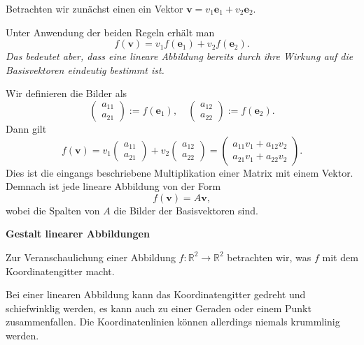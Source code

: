 \documentclass[9pt]{beamer}
\newcommand{\bv}[1]{\mathbf{#1}}
\newcommand{\R}{\mathbb R}
\newcommand{\strong}[1]{\textsf{\textbf{#1}}}
\newcommand{\parspace}{\vspace{0.8em}}
\begin{document}
\begin{frame}
Betrachten wir zunächst einen ein Vektor $\bv v = v_1\bv e_1+v_2\bv e_2$.

\parspace
Unter Anwendung der beiden Regeln erhält man\pause
\[f(\bv v) = v_1f(\bv e_1)+v_2f(\bv e_2).\]\pause
\emph{Das bedeutet aber, dass eine lineare Abbildung bereits durch ihre
Wirkung auf die Basisvektoren eindeutig bestimmt ist.}
\end{frame}

\begin{frame}
Wir definieren die Bilder als
\[\begin{pmatrix}a_{11}\\ a_{21}\end{pmatrix} := f(\bv e_1),\quad
\begin{pmatrix}a_{12}\\ a_{22}\end{pmatrix} := f(\bv e_2).\]
Dann gilt
\[f(\bv v) = v_1\begin{pmatrix}a_{11}\\ a_{21}\end{pmatrix}
+ v_2\begin{pmatrix}a_{12}\\ a_{22}\end{pmatrix}
= \begin{pmatrix}
a_{11}v_1+a_{12}v_2\\
a_{21}v_1+a_{22}v_2
\end{pmatrix}.\]\pause
Dies ist die eingangs beschriebene Multiplikation einer Matrix mit einem
Vektor. Demnach ist jede lineare Abbildung von der Form
\[f(\bv v) = A\bv v,\]
wobei die Spalten von $A$ die Bilder der Basisvektoren sind.
\end{frame}

\begin{frame}
\begin{center}
\strong{Gestalt linearer Abbildungen}
\end{center}
\end{frame}

\begin{frame}
Zur Veranschaulichung einer Abbildung $f\colon\R^2\to\R^2$
betrachten wir, was $f$ mit dem Koordinatengitter macht.

\parspace
Bei einer linearen Abbildung kann das Koordinatengitter gedreht
und schiefwinklig werden, es kann auch zu einer Geraden oder einem
Punkt zusammenfallen. Die Koordinatenlinien können allerdings
niemals krummlinig werden.
\end{frame}
\end{document}

